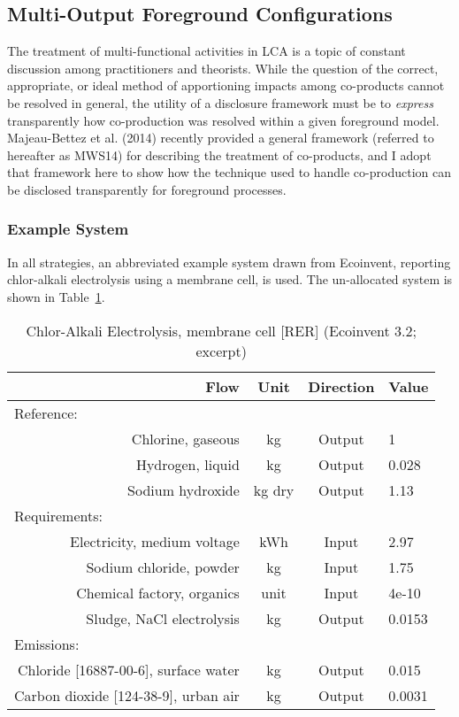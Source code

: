 \subsection{Multi-Output Foreground Configurations}

The treatment of multi-functional activities in LCA is a topic of constant discussion among practitioners and theorists.  While the question of the correct, appropriate, or ideal method of apportioning impacts among co-products cannot be resolved in general, the utility of a disclosure framework must be to \textit{express} transparently how co-production was resolved within a given foreground model.  Majeau-Bettez et al. (2014) recently provided a general framework (referred to hereafter as MWS14) for describing the treatment of co-products, and I adopt that framework here to show how the technique used to handle co-production can be disclosed transparently for foreground processes.

\subsubsection{Example System}

In all strategies, an abbreviated example system drawn from Ecoinvent, reporting chlor-alkali electrolysis using a membrane cell, is used.  The un-allocated system is shown in Table~\ref{tbl:chlor-alkali}.

\begin{table}
  \begin{center}
  \caption{Chlor-Alkali Electrolysis, membrane cell [RER] (Ecoinvent 3.2; excerpt)}
  \label{tbl:chlor-alkali}
  \begin{tabular}{rccl}
    \toprule
    \bf Flow & \bf Unit & \bf Direction & \bf Value \\
    \midrule
    \multicolumn{4}{l}{Reference:} \\
    Chlorine, gaseous & kg & Output & 1 \\
    Hydrogen, liquid & kg & Output & 0.028 \\
    Sodium hydroxide & kg dry & Output & 1.13 \\
    \midrule
    \multicolumn{4}{l}{Requirements:} \\
    Electricity, medium voltage & kWh & Input & 2.97 \\
    Sodium chloride, powder & kg & Input & 1.75 \\
    Chemical factory, organics & unit & Input & 4e-10 \\
    Sludge, NaCl electrolysis & kg & Output & 0.0153 \\[1ex]
    \multicolumn{4}{l}{Emissions:} \\
    Chloride [16887-00-6], surface water & kg & Output & 0.015 \\
    Carbon dioxide [124-38-9], urban air & kg & Output & 0.0031 \\
    \bottomrule
  \end{tabular}
  \end{center}
\end{table}

